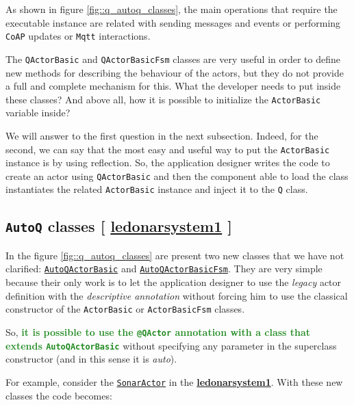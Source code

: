 As shown in figure \ref{fig::q_autoq_classes}, the main operations that require the executable instance are related with sending messages and events or performing \texttt{CoAP} updates or \texttt{Mqtt} interactions.

The \texttt{QActorBasic} and \texttt{QActorBasicFsm} classes are very useful in order to define new methods for describing the behaviour of the actors, but they do not provide a full and complete mechanism for this.
What the developer needs to put inside these classes? And above all, how it is possible to initialize the \texttt{ActorBasic} variable inside?

We will answer to the first question in the next subsection. Indeed, for the second, we can say that the most easy and useful way to put the \texttt{ActorBasic} instance is by using reflection. So, the application designer writes the code to create an actor using \texttt{QActorBasic} and then the component able to load the class instantiates the related \texttt{ActorBasic} instance and inject it to the \texttt{Q} class.

\subsection{\texttt{AutoQ} classes  [ \href{https://github.com/LM-96/QA-Extensions/tree/main/it.unibo.ledsonardemo1}{\textcolor{Emerald}{\textbf{ledonarsystem1}}} ]}

In the figure \ref{fig::q_autoq_classes} are present two new classes that we have not clarified: \href{https://github.com/LM-96/QA-Extensions/blob/main/it.unibo.qakactor/src/main/kotlin/AutoQActorBasic.kt}{\texttt{AutoQActorBasic}} and \href{https://github.com/LM-96/QA-Extensions/blob/main/it.unibo.qakactor/src/main/kotlin/AutoQActorBasicFsm.kt}{\texttt{AutoQActorBasicFsm}}. They are very simple because their only work is to let the application designer to use the \textit{legacy} actor definition with the \textit{descriptive annotation} without forcing him to use the classical constructor of the \texttt{ActorBasic} or \texttt{ActorBasicFsm} classes.

So, \textcolor{ForestGreen}{\textbf{it is possible to use the \texttt{@QActor} annotation with a class that extends \texttt{AutoQActorBasic}}} without specifying any parameter in the superclass constructor (and in this sense it is \textit{auto}).

For example, consider the \href{https://github.com/LM-96/QA-Extensions/blob/main/it.unibo.ledsonardemo1/src/main/kotlin/it/unibo/ledsonardemo1/actors/SonarActor.kt}{\texttt{SonarActor}} in the \href{https://github.com/LM-96/QA-Extensions/tree/main/it.unibo.ledsonardemo1}{\textcolor{Emerald}{\textbf{ledonarsystem1}}}. With these new classes the code becomes:



